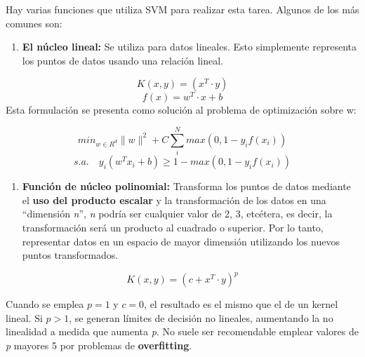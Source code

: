 \documentclass[
]{book}
\providecommand{\tightlist}{%
  \setlength{\itemsep}{0pt}\setlength{\parskip}{0pt}}
\begin{document}
Hay varias funciones que utiliza SVM para realizar esta tarea. Algunos de los más comunes son:

\begin{enumerate}
\def\labelenumi{\arabic{enumi}.}
\tightlist
\item
  \textbf{El núcleo lineal:} Se utiliza para datos lineales. Esto simplemente representa los puntos de datos usando una relación lineal.
\end{enumerate}

\[K(x, y)=(x^T \cdot y)\]
\[f(x)=w^T \cdot x + b\]
Esta formulación se presenta como solución al problema de optimización sobre w:

\[min_{w\in R^d} \parallel w \parallel ^2+ C\sum_{i}^{N}{max(0, 1-y_if(x_i))}\]
\[s.a. \quad y_i(w^T x_i+b) \geq 1 - max(0, 1-y_if(x_i))\]

\begin{enumerate}
\def\labelenumi{\arabic{enumi}.}
\setcounter{enumi}{1}
\tightlist
\item
  \textbf{Función de núcleo polinomial:} Transforma los puntos de datos mediante el \textbf{uso del producto escalar} y la transformación de los datos en una ``dimensión \emph{n}'', \emph{n} podría ser cualquier valor de 2, 3, etcétera, es decir, la transformación será un producto al cuadrado o superior. Por lo tanto, representar datos en un espacio de mayor dimensión utilizando los nuevos puntos transformados.
\end{enumerate}

\[K(x, y)=(c+ x^T \cdot y)^p\]

Cuando se emplea \(p=1\) y \(c=0\), el resultado es el mismo que el de un kernel lineal. Si \(p>1\), se generan límites de decisión no lineales, aumentando la no linealidad a medida que aumenta \emph{p}. No suele ser recomendable emplear valores de \emph{p} mayores 5 por problemas de \textbf{overfitting}.
\end{document}
